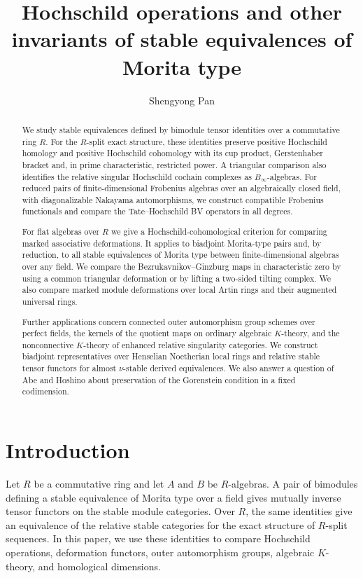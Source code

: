 \documentclass[12pt,a4paper,english,reqno]{amsart}
\title[Invariants of Morita-type stable equivalences]
{Hochschild operations and other invariants of stable equivalences of Morita type}
\author{Shengyong Pan}
\date{}
\numberwithin{equation}{section}
\theoremstyle{plain}
\theoremstyle{definition}
\begin{document}
\begin{abstract}
We study stable equivalences defined by bimodule tensor identities
over a commutative ring $R$. For the $R$-split exact structure,
these identities preserve positive Hochschild homology and
positive Hochschild cohomology with its cup product, Gerstenhaber
bracket and, in prime characteristic, restricted power. A
triangular comparison also identifies the relative singular
Hochschild cochain complexes as $B_\infty$-algebras.
For reduced pairs of finite-dimensional Frobenius algebras
over an algebraically closed field, with diagonalizable
Nakayama automorphisms, we construct compatible Frobenius
functionals and compare the Tate--Hochschild BV operators in
all degrees.

For flat algebras over $R$ we give a Hochschild-cohomological
criterion for comparing marked associative deformations.
It applies to biadjoint Morita-type pairs and, by reduction,
to all stable equivalences of Morita type between
finite-dimensional algebras over any field. We compare the
Bezrukavnikov--Ginzburg maps in characteristic zero by using
a common triangular deformation or by lifting a two-sided
tilting complex. We also compare marked module deformations
over local Artin rings and their augmented universal rings.

Further applications concern connected outer automorphism
group schemes over perfect fields, the kernels of the
quotient maps on ordinary algebraic $K$-theory, and the
nonconnective $K$-theory of enhanced relative singularity
categories. We construct biadjoint representatives over
Henselian Noetherian local rings and relative stable tensor
functors for almost $\nu$-stable derived equivalences.
We also answer a question of Abe and Hoshino about preservation
of the Gorenstein condition in a fixed codimension.
\end{abstract}

\maketitle
\setcounter{tocdepth}{1}{\small\tableofcontents}
\section{Introduction}
\label{sec:introduction}

Let $R$ be a commutative ring and let $A$ and $B$ be $R$-algebras.
A pair of bimodules defining a stable equivalence of Morita type over a
field gives mutually inverse tensor functors on the stable module
categories. Over $R$, the same identities give an equivalence of the
relative stable categories for the exact structure of $R$-split
sequences. In this paper, we use these identities to compare Hochschild
operations, deformation functors, outer automorphism groups, algebraic
$K$-theory, and homological dimensions.
\end{document}
